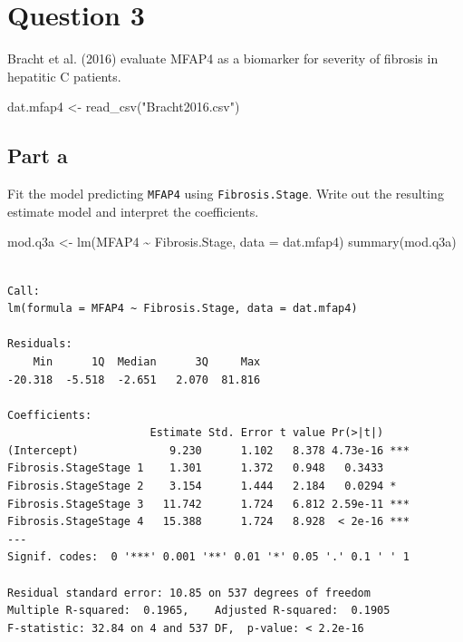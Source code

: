 \documentclass[
]{article}
\newenvironment{Shaded}{\begin{snugshade}}{\end{snugshade}}
\newcommand{\AttributeTok}[1]{\textcolor[rgb]{0.40,0.45,0.13}{#1}}
\newcommand{\FunctionTok}[1]{\textcolor[rgb]{0.28,0.35,0.67}{#1}}
\newcommand{\NormalTok}[1]{\textcolor[rgb]{0.00,0.23,0.31}{#1}}
\newcommand{\OtherTok}[1]{\textcolor[rgb]{0.00,0.23,0.31}{#1}}
\newcommand{\SpecialCharTok}[1]{\textcolor[rgb]{0.37,0.37,0.37}{#1}}
\newcommand{\StringTok}[1]{\textcolor[rgb]{0.13,0.47,0.30}{#1}}
\begin{document}
\section{Question 3}\label{question-3}

{Bracht et al.} (2016) evaluate MFAP4 as a biomarker for severity of
fibrosis in hepatitic C patients.

\scriptsize

\begin{Shaded}
\begin{Highlighting}[numbers=left,,]
\NormalTok{dat.mfap4 }\OtherTok{\textless{}{-}} \FunctionTok{read\_csv}\NormalTok{(}\StringTok{"Bracht2016.csv"}\NormalTok{)}
\end{Highlighting}
\end{Shaded}

\normalsize

\subsection{Part a}\label{part-a-2}

Fit the model predicting \texttt{MFAP4} using \texttt{Fibrosis.Stage}.
Write out the resulting estimate model and interpret the coefficients.

\normalsize

\begin{Shaded}
\begin{Highlighting}[numbers=left,,]
\NormalTok{mod.q3a }\OtherTok{\textless{}{-}} \FunctionTok{lm}\NormalTok{(MFAP4 }\SpecialCharTok{\textasciitilde{}}\NormalTok{ Fibrosis.Stage, }\AttributeTok{data =}\NormalTok{ dat.mfap4)}
\FunctionTok{summary}\NormalTok{(mod.q3a)}
\end{Highlighting}
\end{Shaded}

\begin{verbatim}

Call:
lm(formula = MFAP4 ~ Fibrosis.Stage, data = dat.mfap4)

Residuals:
    Min      1Q  Median      3Q     Max 
-20.318  -5.518  -2.651   2.070  81.816 

Coefficients:
                      Estimate Std. Error t value Pr(>|t|)    
(Intercept)              9.230      1.102   8.378 4.73e-16 ***
Fibrosis.StageStage 1    1.301      1.372   0.948   0.3433    
Fibrosis.StageStage 2    3.154      1.444   2.184   0.0294 *  
Fibrosis.StageStage 3   11.742      1.724   6.812 2.59e-11 ***
Fibrosis.StageStage 4   15.388      1.724   8.928  < 2e-16 ***
---
Signif. codes:  0 '***' 0.001 '**' 0.01 '*' 0.05 '.' 0.1 ' ' 1

Residual standard error: 10.85 on 537 degrees of freedom
Multiple R-squared:  0.1965,    Adjusted R-squared:  0.1905 
F-statistic: 32.84 on 4 and 537 DF,  p-value: < 2.2e-16
\end{verbatim}
\end{document}
